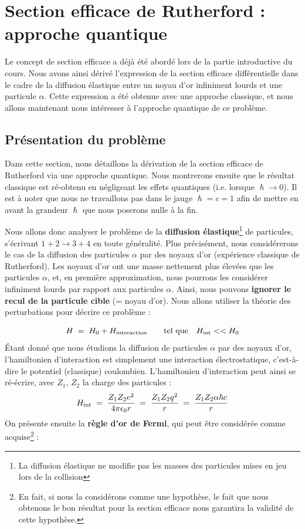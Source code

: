 ﻿

\section{Section efficace de Rutherford : approche quantique}

Le concept de section efficace a déjà été abordé lors de la partie introductive du cours. Nous avons ainsi dérivé l'expression de la section efficace différentielle dans le cadre de la diffusion élastique entre un noyau d'or infiniment lourds et une particule $\alpha$. Cette expression a été obtenue avec une approche classique, et nous allons maintenant nous intéresser à l'approche quantique de ce problème.

\subsection{Présentation du problème}

Dans cette section, nous détaillons la dérivation de la section efficace de Rutherford via une approche quantique. Nous montrerons ensuite que le résultat classique est ré-obtenu en négligeant les effets quantiques (i.e. lorsque $\hslash \rightarrow 0$). Il est à noter que nous ne travaillons pas dans le jauge $\hslash = c = 1$ afin de mettre en avant la grandeur $\hslash$ que nous poserons nulle à la fin.

Nous allons donc analyser le problème de la \textbf{diffusion élastique}\footnote{La diffusion élastique ne modifie pas les masses des particules mises en jeu lors de la collision} de particules, s'écrivant $1+2 \rightarrow 3+4$ en toute généralité. Plus précisément, nous considérerons le cas de la diffusion des particules $\alpha$ par des noyaux d'or (expérience classique de Rutherford). Les noyaux d'or ont une masse nettement plus élevées que les particules $\alpha$, et, en première approximation, nous pourrons les considérer infiniment lourds par rapport aux particules $\alpha$. Ainsi, nous pouvons \textbf{ignorer le recul de la particule cible }(= noyau d'or). Nous allons utiliser la théorie des perturbations pour décrire ce problème :

\[
    H \; = \; H_0 + H_\text{interaction} \qquad \textrm{tel que} \quad H_\text{int} << H_0
\]
Étant donné que nous étudions la diffusion de particules $\alpha$ par des noyaux d'or, l'hamiltonien d'interaction est simplement une interaction électrostatique, c'est-à-dire le potentiel (classique) coulombien. L'hamiltonien d'interaction peut ainsi se ré-écrire, avec $Z_1$, $Z_2$ la charge des particules :
\[
    H_\text{int} \; = \; 
    \dfrac{Z_1 Z_2 e^2}{4\pi \epsilon_0 r} 
    \; = \; \dfrac{Z_1 Z_2 q^2}{r} 
    \; = \; \dfrac{Z_1 Z_2 \alpha \hbar c}{r}
\]
On présente ensuite la \textbf{règle d'or de Fermi}, qui peut être considérée comme acquise\footnote{En fait, si nous la considérons comme une hypothèse, le fait que nous obtenons le bon résultat pour la section efficace nous garantira la validité de cette hypothèse.} :

